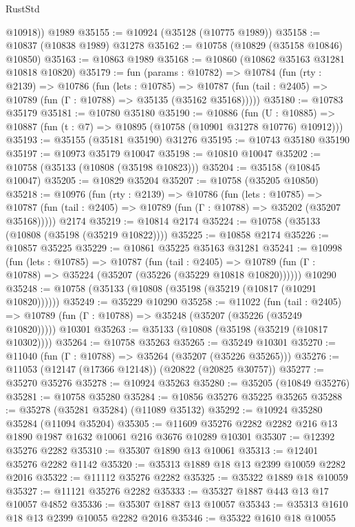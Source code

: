 \begin{lexlean}{RustStd}
\begin{coremodule}
        @10918))
    @1989
@35155 := @10924 (@35128 (@10775 @1989))
@35158 := @10837 (@10838 @1989) @31278
@35162 := @10758 (@10829 (@35158 @10846) @10850)
@35163 := @10863 @1989
@35168 := @10860 (@10862 @35163 @31281 @10818 @10820)
@35179 := fun (params : @10782) =>
  @10784
    (fun (rty : @2139) =>
    @10786
      (fun (lets : @10785) =>
      @10787 (fun (tail : @2405) => @10789 (fun (Γ : @10788) => @35135 (@35162 @35168)))))
@35180 := @10783 @35179
@35181 := @10780 @35180
@35190 := @10886
    (fun (U : @10885) => @10887 (fun (t : @7) => @10895 (@10758 (@10901 @31278 @10776) @10912)))
@35193 := @35155 (@35181 @35190) @31276
@35195 := @10743 @35180 @35190
@35197 := @10973 @35179 @10047
@35198 := @10810 @10047
@35202 := @10758 (@35133 (@10808 (@35198 @10823)))
@35204 := @35158 (@10845 @10047)
@35205 := @10829 @35204
@35207 := @10758 (@35205 @10850)
@35218 := @10976
    (fun (rty : @2139) =>
    @10786
      (fun (lets : @10785) =>
      @10787 (fun (tail : @2405) => @10789 (fun (Γ : @10788) => @35202 (@35207 @35168)))))
    @2174
@35219 := @10814 @2174
@35224 := @10758 (@35133 (@10808 (@35198 (@35219 @10822))))
@35225 := @10858 @2174
@35226 := @10857 @35225
@35229 := @10861 @35225 @35163 @31281
@35241 := @10998
    (fun (lets : @10785) =>
    @10787
      (fun (tail : @2405) =>
      @10789 (fun (Γ : @10788) => @35224 (@35207 (@35226 (@35229 @10818 @10820))))))
    @10290
@35248 := @10758 (@35133 (@10808 (@35198 (@35219 (@10817 (@10291 @10820))))))
@35249 := @35229 @10290
@35258 := @11022
    (fun (tail : @2405) => @10789 (fun (Γ : @10788) => @35248 (@35207 (@35226 (@35249 @10820)))))
    @10301
@35263 := @35133 (@10808 (@35198 (@35219 (@10817 @10302))))
@35264 := @10758 @35263
@35265 := @35249 @10301
@35270 := @11040 (fun (Γ : @10788) => @35264 (@35207 (@35226 @35265)))
@35276 := @11053 (@12147 (@17366 @12148)) (@20822 (@20825 @30757))
@35277 := @35270 @35276
@35278 := @10924 @35263
@35280 := @35205 (@10849 @35276)
@35281 := @10758 @35280
@35284 := @10856 @35276 @35225 @35265
@35288 := @35278 (@35281 @35284) (@11089 @35132)
@35292 := @10924 @35280 @35284 (@11094 @35204)
@35305 := @11609 @35276 @2282 @2282 @216 @13 @1890 @1987 @1632 @10061 @216 @3676 @10289 @10301
@35307 := @12392 @35276 @2282
@35310 := @35307 @1890 @13 @10061
@35313 := @12401 @35276 @2282 @1142
@35320 := @35313 @1889 @18 @13 @2399 @10059 @2282 @2016
@35322 := @11112 @35276 @2282
@35325 := @35322 @1889 @18 @10059
@35327 := @11121 @35276 @2282
@35333 := @35327 @1887 @443 @13 @17 @10057 @4852
@35336 := @35307 @1887 @13 @10057
@35343 := @35313 @1610 @18 @13 @2399 @10055 @2282 @2016
@35346 := @35322 @1610 @18 @10055

\end{coremodule}
\end{lexlean}
